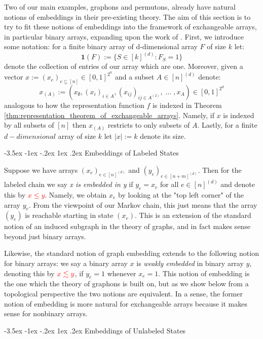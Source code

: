 \documentclass[11pt,oneside,reqno]{article}
\makeatletter
\theoremstyle{plain}
\theoremstyle{definition}
\numberwithin{equation}{section}
\def\subsection#1{\@startsection {subsection}{2}{0pt}%
{-3.5ex \@plus -1ex \@minus -.2ex}%
{1ex \@plus.2ex}%
{\bf\mathversion{bold}}{#1}}
\renewcommand{\cite}{\citet}
\renewcommand{\leq}{\leqslant}
\newcommand{\red}{\textcolor{red}}
\makeatother
\begin{document}
Two of our main examples, graphons and permutons, already have natural notions of embeddings in their pre-existing theory. The aim of this section is to try to fit these notions of embeddings into the framework of exchangeable arrays, in particular binary arrays, expanding upon the work of \cite{borgs2007convergent}. First, we introduce some notation: for a finite binary array of d-dimensional array $F$ of size $k$ let:
%
\[\mathbf 1(F) := \{ S \in [k]^{(d)} :  F_S = 1 \}\]
%
\noindent denote the collection of entries of our array which are one. Moreover, given a vector $x := (x_e)_{e \subseteq [n]} \in [0,1]^{2^n}$ and a subset $A \in [n]^{(d)}$ denote:
%
\[x_{(A)} := (x_\emptyset, (x_i)_{i \in A}, (x_{ij})_{ij \in A^{(2)}}, \;... \;, x_A) \in [0,1]^{2^d}\]
%
\noindent analogous to how the representation function $f$ is indexed in Theorem \ref{thm:representation_theorem_of_exchangeable_arrays}. Namely, if $x$ is indexed by all subsets of $[n]$ then $x_{(A)}$ restricts to only subsets of $A$. Lastly, for a finite $d-dimensional$ array of size $k$ let $|x| := k$ denote its size.

\subsection{Embeddings of Labeled States}

Suppose we have arrays $(x_e)_{e \in [n]^{(d)}}$ and $(y_e)_{e \in [n+m]^{(d)}}$. Then for the labeled chain we say \textit{x is embedded in y} if $y_e = x_e$ for all $e \in [n]^{(d)}$ and denote this by \red{$x \leq y$}. Namely, we obtain $x_e$ by looking at the "top left corner" of the array $y_e$. From the viewpoint of our Markov chain, this just means that the array $(y_e)$ is reachable starting in state $(x_e)$. This is an extension of the standard notion of an induced subgraph in the theory of graphs, and in fact makes sense beyond just binary arrays.

Likewise, the standard notion of graph embedding extends to the following notion for binary arrays: we say a binary array $x$ is \textit{weakly embedded} in binary array $y$, denoting this by $\red{x \lesssim y}$, if $y_e = 1$ whenever $x_e = 1$. This notion of embedding is the one which the theory of graphons is built on, but as we show below from a topological perspective the two notions are equivalent. In a sense, the former notion of embedding is more natural for exchangeable arrays because it makes sense for nonbinary arrays.


\subsection{Embeddings of Unlabeled States}
\end{document}
